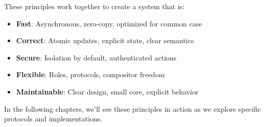 These principles work together to create a system that is:
\begin{itemize}
    \item \textbf{Fast}: Asynchronous, zero-copy, optimized for common case
    \item \textbf{Correct}: Atomic updates, explicit state, clear semantics
    \item \textbf{Secure}: Isolation by default, authenticated actions
    \item \textbf{Flexible}: Roles, protocols, compositor freedom
    \item \textbf{Maintainable}: Clear design, small core, explicit behavior
\end{itemize}

In the following chapters, we'll see these principles in action as we explore specific protocols and implementations.

\clearpage

